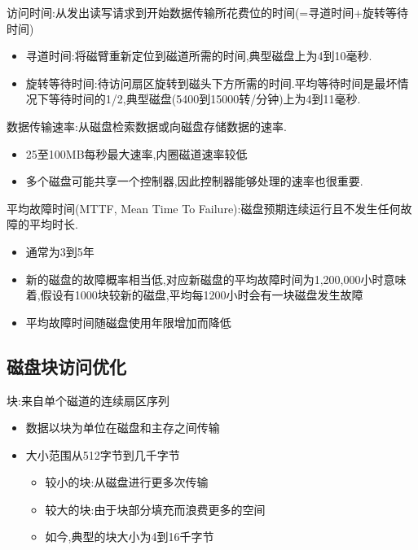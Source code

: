 访问时间:从发出读写请求到开始数据传输所花费位的时间(=寻道时间+旋转等待时间)

\begin{itemize}
    \item 寻道时间:将磁臂重新定位到磁道所需的时间,典型磁盘上为4到10毫秒.
    \item 旋转等待时间:待访问扇区旋转到磁头下方所需的时间.平均等待时间是最坏情况下等待时间的1/2,典型磁盘(5400到15000转/分钟)上为4到11毫秒.
\end{itemize}

数据传输速率:从磁盘检索数据或向磁盘存储数据的速率.

\begin{itemize}
    \item 25至100MB每秒最大速率,内圈磁道速率较低
    \item 多个磁盘可能共享一个控制器,因此控制器能够处理的速率也很重要.
\end{itemize}

平均故障时间(MTTF, Mean Time To Failure):磁盘预期连续运行且不发生任何故障的平均时长.

\begin{itemize}
    \item 通常为3到5年
    \item 新的磁盘的故障概率相当低,对应新磁盘的平均故障时间为1,200,000小时意味着,假设有1000块较新的磁盘,平均每1200小时会有一块磁盘发生故障
    \item 平均故障时间随磁盘使用年限增加而降低
\end{itemize}

\subsection{磁盘块访问优化}

块:来自单个磁道的连续扇区序列

\begin{itemize}
    \item 数据以块为单位在磁盘和主存之间传输
    \item 大小范围从512字节到几千字节
       \begin{itemize}
          \item 较小的块:从磁盘进行更多次传输
          \item 较大的块:由于块部分填充而浪费更多的空间
          \item 如今,典型的块大小为4到16千字节
       \end{itemize}
\end{itemize}

